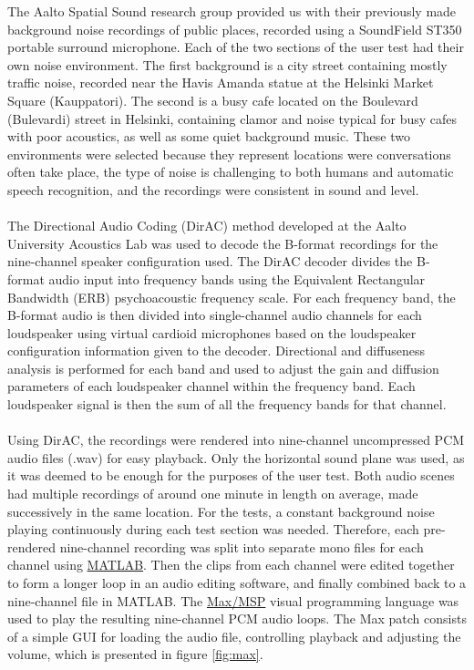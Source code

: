 \documentclass[english, 12pt, a4paper, pdftex, elec, utf8]{aaltothesis}
\begin{document}
The Aalto Spatial Sound research group provided us with their previously made background noise recordings of public places, recorded using a SoundField ST350 portable surround microphone. Each of the two sections of the user test had their own noise environment. The first background is a city street containing mostly traffic noise, recorded near the Havis Amanda statue at the Helsinki Market Square (Kauppatori). The second is a busy cafe located on the Boulevard (Bulevardi) street in Helsinki, containing clamor and noise typical for busy cafes with poor acoustics, as well as some quiet background music. These two environments were selected because they represent locations were conversations often take place, the type of noise is challenging to both humans and automatic speech recognition, and the recordings were consistent in sound and level. \\\\ 
The Directional Audio Coding (DirAC) method developed at the Aalto University Acoustics Lab was used to decode the B-format recordings for the nine-channel speaker configuration used. The DirAC decoder divides the B-format audio input into frequency bands using the Equivalent Rectangular Bandwidth (ERB) psychoacoustic frequency scale. For each frequency band, the B-format audio is then divided into single-channel audio channels for each loudspeaker using virtual cardioid microphones based on the loudspeaker configuration information given to the decoder. Directional and diffuseness analysis is performed for each band and used to adjust the gain and diffusion parameters of each loudspeaker channel within the frequency band. Each loudspeaker signal is then the sum of all the frequency bands for that channel. \cite[p.~291--292]{pulkki2006directional, pulkki2015communication} \\\\
Using DirAC, the recordings were rendered into nine-channel uncompressed PCM audio files (.wav) for easy playback. Only the horizontal sound plane was used, as it was deemed to be enough for the purposes of the user test. Both audio scenes had multiple recordings of around one minute in length on average, made successively in the same location. For the tests, a constant background noise playing continuously during each test section was needed. Therefore, each pre-rendered nine-channel recording was split into separate mono files for each channel using \href{https://se.mathworks.com/products/matlab.html}{MATLAB}. Then the clips from each channel were edited together to form a longer loop in an audio editing software, and finally combined back to a nine-channel file in MATLAB. The \href{https://cycling74.com/products/max/}{Max/MSP} visual programming language was used to play the resulting nine-channel PCM audio loops. The Max patch consists of a simple GUI for loading the audio file, controlling playback and adjusting the volume, which is presented in figure \ref{fig:max}. \\
\end{document}
